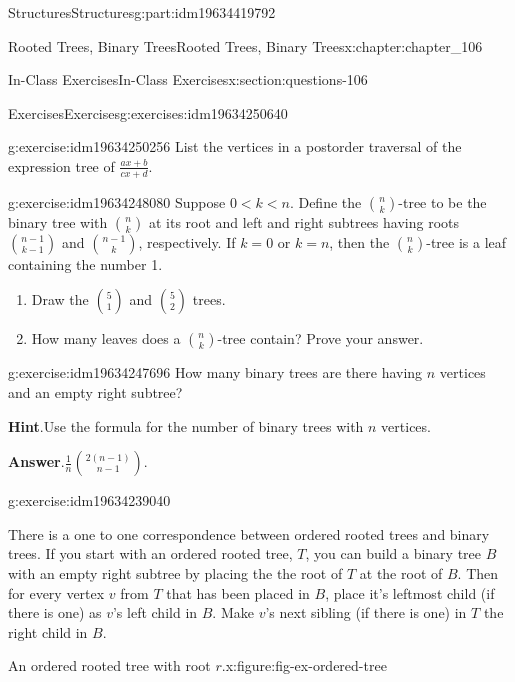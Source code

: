 \documentclass[oneside,10pt,]{book}
\newcommand{\blocktitlefont}{\relax}
\numberwithin{equation}{section}
\newcommand{\lt}{<}
\begin{document}
\begin{partptx}{Structures}{}{Structures}{}{}{g:part:idm19634419792}
\begin{chapterptx}{Rooted Trees, Binary Trees}{}{Rooted Trees, Binary Trees}{}{}{x:chapter:chapter_106}
\begin{sectionptx}{In-Class Exercises}{}{In-Class Exercises}{}{}{x:section:questions-106}
\begin{exercises-subsection-numberless}{Exercises}{}{Exercises}{}{}{g:exercises:idm19634250640}
\begin{exercisegroup}
\begin{divisionexerciseeg}{2}{}{}{g:exercise:idm19634250256}%
List the vertices in a postorder traversal of the  expression tree of \(\frac{a x + b}{c x + d}\).%
\end{divisionexerciseeg}%
\begin{divisionexerciseeg}{3}{}{}{g:exercise:idm19634248080}%
Suppose \(0 \lt k \lt n\). Define the \(\binom{n}{k}\)-tree to be the binary tree with \(\binom{n}{k}\) at its root and left and right subtrees having roots \(\binom{n-1}{k-1}\) and \(\binom{n-1}{k}\), respectively. If \(k=0\) or \(k=n\), then the \(\binom{n}{k}\)-tree is a leaf containing the number 1.%
\begin{enumerate}[label=(\alph*)]
\item{}Draw the \(\binom{5}{1}\) and \(\binom{5}{2}\) trees.%
\item{}How many leaves does a \(\binom{n}{k}\)-tree contain?  Prove your answer.%
\end{enumerate}
%
\end{divisionexerciseeg}%
\begin{divisionexerciseeg}{4}{}{}{g:exercise:idm19634247696}%
How many binary trees are there having \(n\) vertices and an empty right subtree?%
\par\smallskip%
\noindent\textbf{\blocktitlefont Hint}.\hypertarget{g:hint:idm19634240352}{}\quad{}Use the formula for the number of binary trees with \(n\) vertices.%
\par\smallskip%
\noindent\textbf{\blocktitlefont Answer}.\hypertarget{g:answer:idm19634239424}{}\quad{}\(\frac{1}{n} \binom{2(n-1)}{n-1}\).\end{divisionexerciseeg}%
\begin{divisionexerciseeg}{5}{}{}{g:exercise:idm19634239040}%
\begin{sidebyside}{2}{0}{0}{0}%
\begin{sbspanel}{0.5}%
There is a one to one correspondence between ordered rooted trees and binary trees.  If you start with an ordered rooted tree, \(T\), you can build a binary tree \(B\) with an empty right subtree by placing the the root of \(T\) at the root of \(B\).  Then for every vertex \(v\) from \(T\) that has been placed in \(B\), place it's leftmost child (if there is one) as \(v\)'s left child in \(B\). Make \(v\)'s next sibling (if there is one) in \(T\) the right child in \(B\).%
\end{sbspanel}%
\begin{sbspanel}{0.5}%
\begin{figureptx}{An ordered rooted tree with root \(r\).}{x:figure:fig-ex-ordered-tree}{}%

\end{figureptx}
\end{sbspanel}
\end{sidebyside}
\end{divisionexerciseeg}
\end{exercisegroup}
\end{exercises-subsection-numberless}
\end{sectionptx}
\end{chapterptx}
\end{partptx}
\end{document}
